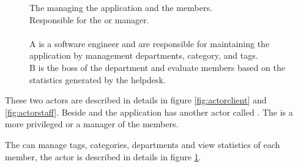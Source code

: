 \begin{figure}[h]
\begin{sadlistar}{\admin[c]}
 The \admin[] managing the application and the \staff{} members. \\
 Responsible for the \hdesk[] or \astaff[] manager. \\
\\ \admin[c] A is a software engineer and are responsible for maintaining the application by management departments, category, and tags. \\
\admin[c] B is the boss of the department and evaluate \astaff[] members based on the statistics generated by the helpdesk.
 \end{sadlistar}
 \caption{}
 \label{fig:actoradmin}
 \end{figure}


These two actors are described in details in figure \ref{fig:actorclient} and \ref{fig:actorstaff}. 
Beside \astaff{} and \aclient{} the application has another actor called \sadmin{}. 
The \sadmin{} is a more privileged \astaff{} or a manager of the \astaff members. 

The \sadmin{} can manage tags, categories, departments and view statistics of each \astaff [] member, the actor \admin[] is described in details in figure \ref{fig:actoradmin}.
